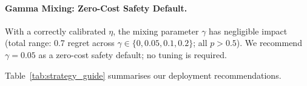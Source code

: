 \paragraph{Gamma Mixing: Zero-Cost Safety Default.}
With a correctly calibrated $\eta$, the mixing parameter $\gamma$ has
negligible impact (total range: 0.7 regret across
$\gamma \in \{0, 0.05, 0.1, 0.2\}$; all $p{>}0.5$).
We recommend $\gamma{=}0.05$ as a zero-cost safety default; no tuning
is required.

Table~\ref{tab:strategy_guide} summarises our deployment recommendations.
